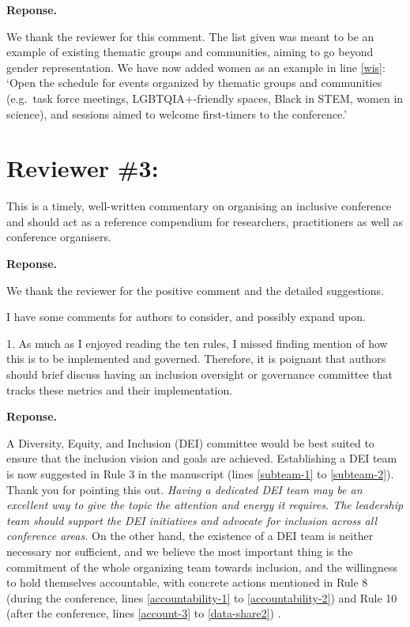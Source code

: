 \documentclass{article}
\newenvironment{Reply}{\noindent\color{BlueViolet}\textbf{Reponse.}}{\vspace{1em}}
\begin{document}
\begin{Reply}

    We thank the reviewer for this comment. The list given was meant to be an example of existing thematic groups and communities, aiming to go beyond gender representation.
    We have now added women as an example in line \ref{wis}:
    `Open the schedule for events organized by thematic groups and communities (e.g.\ task force meetings, LGBTQIA+-friendly spaces, Black in STEM, women in science), and sessions aimed to welcome first-timers to the conference.'
\end{Reply}

\section*{Reviewer \#3:} 
This is a timely, well-written commentary on organising an inclusive conference and should act as a reference compendium for researchers, practitioners as well as conference organisers.

\begin{Reply}

    We thank the reviewer for the positive comment and the detailed suggestions.
\end{Reply}

I have some comments for authors to consider, and possibly expand upon.

1. As much as I enjoyed reading the ten rules, I missed finding mention of how this is to be implemented and governed. Therefore, it is poignant that authors should brief discuss having an inclusion oversight or governance committee that tracks these metrics and their implementation.

\begin{Reply}

    A Diversity, Equity, and Inclusion (DEI) committee would be best suited to ensure that the inclusion vision and goals are achieved. 
    Establishing a DEI team is now suggested in Rule 3 in the manuscript (lines \ref{subteam-1} to \ref{subteam-2}). Thank you for pointing this out. 
    \textit{ 
    Having a dedicated DEI team may be an excellent way to give the topic the attention and energy it requires.
    The leadership team should support the DEI initiatives and advocate for inclusion across all conference areas.}
    On the other hand, the existence of a DEI team is neither necessary nor sufficient, and we believe the most important thing is the commitment of the 
    whole organizing team towards inclusion, and the willingness to hold themselves accountable, with concrete actions mentioned in Rule 8 (during the conference, lines \ref{accountability-1} to \ref{accountability-2}) and Rule 10 (after the conference, lines \ref{account-3} to \ref{data-share2}) .
    
\end{Reply}
\end{document}
